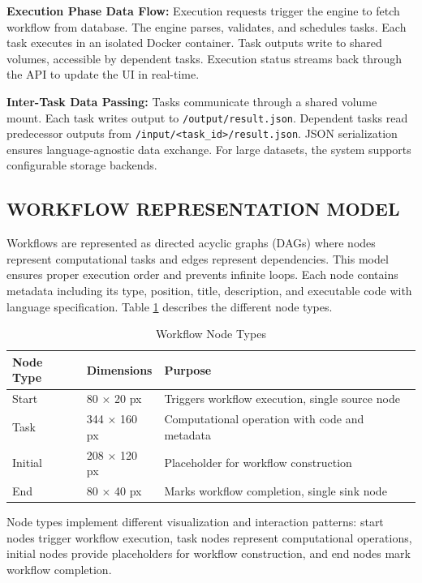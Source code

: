 \documentclass[12pt]{article}
\begin{document}
\textbf{Execution Phase Data Flow:} Execution requests trigger the engine to fetch workflow from database. The engine parses, validates, and schedules tasks. Each task executes in an isolated Docker container. Task outputs write to shared volumes, accessible by dependent tasks. Execution status streams back through the API to update the UI in real-time.

\textbf{Inter-Task Data Passing:} Tasks communicate through a shared volume mount. Each task writes output to \texttt{/output/result.json}. Dependent tasks read predecessor outputs from \texttt{/input/<task\_id>/result.json}. JSON serialization ensures language-agnostic data exchange. For large datasets, the system supports configurable storage backends.

\subsection{WORKFLOW REPRESENTATION MODEL}

Workflows are represented as directed acyclic graphs (DAGs) where nodes represent computational tasks and edges represent dependencies. This model ensures proper execution order and prevents infinite loops. Each node contains metadata including its type, position, title, description, and executable code with language specification. Table \ref{tab:node_types} describes the different node types.

\begin{table}[h]
\centering
\caption{Workflow Node Types}
\label{tab:node_types}
\begin{tabular}{|l|l|p{6cm}|}
\hline
\textbf{Node Type} & \textbf{Dimensions} & \textbf{Purpose} \\
\hline
Start & 80 × 20 px & Triggers workflow execution, single source node \\
Task & 344 × 160 px & Computational operation with code and metadata \\
Initial & 208 × 120 px & Placeholder for workflow construction \\
End & 80 × 40 px & Marks workflow completion, single sink node \\
\hline
\end{tabular}
\end{table}

Node types implement different visualization and interaction patterns: start nodes trigger workflow execution, task nodes represent computational operations, initial nodes provide placeholders for workflow construction, and end nodes mark workflow completion.
\end{document}
